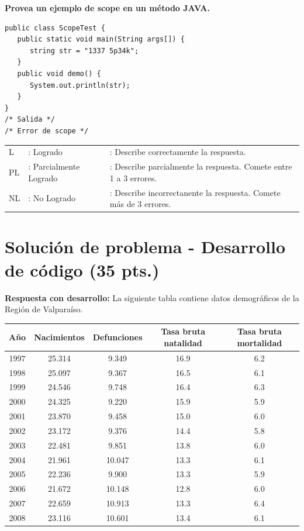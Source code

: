 \documentclass{exam}
\begin{document}
\textbf{Provea un ejemplo de scope en un m\'etodo JAVA.}  
    
\begin{lstlisting}[style=CStyle]
public class ScopeTest {
   public static void main(String args[]) {
      string str = "1337 5p34k";
   }
   public void demo() {
      System.out.println(str);
   }
}
/* Salida */
/* Error de scope */
\end{lstlisting}
    


\begin{table}[H]
    {\small
    \begin{tabular}{lll}
        L  & : Logrado    & : Describe correctamente la respuesta. \\
        PL  & : Parcialmente Logrado & : Describe parcialmente la respuesta. Comete entre 1 a 3 errores.  \\
        NL & : No Logrado & : Describe incorrectanente la respuesta. Comete m\'as de 3 errores. \\
    \end{tabular}}
\end{table}

\clearpage

\vspace{-7mm}
\section{\textbf{Soluci\'on de problema - Desarrollo de c\'odigo (35 pts.)}}

\noindent
\textbf{Respuesta con desarrollo:} La siguiente tabla contiene datos demogr\'aficos de la Regi\'on de Valpara\'iso. 

\begin{table}[H]  
\scriptsize
\centering
\begin{tabular}{|c|c|c|c|c|}\hline
    A\~no	& Nacimientos & Defunciones & Tasa bruta natalidad & Tasa bruta mortalidad\\\hline
    1997 & 25.314 & 9.349  & 16.9 & 6.2\\
    1998 & 25.097 & 9.367  & 16.5 & 6.1\\
    1999 & 24.546 & 9.748  & 16.4 & 6.3\\
    2000 & 24.325 & 9.220  & 15.9 & 5.9\\
    2001 & 23.870 & 9.458  & 15.0 & 6.0\\
    2002 & 23.172 & 9.376  & 14.4 & 5.8\\
    2003 & 22.481 & 9.851  & 13.8 & 6.0\\
    2004 & 21.961 & 10.047 & 13.3 & 6.1\\
    2005 & 22.236 & 9.900  & 13.3 & 5.9\\
    2006 & 21.672 & 10.148 & 12.8 & 6.0\\
    2007 & 22.659 & 10.913 & 13.3 & 6.4\\
    2008 & 23.116 & 10.601 & 13.4 & 6.1\\\hline
\end{tabular}
\end{table}
\end{document}
